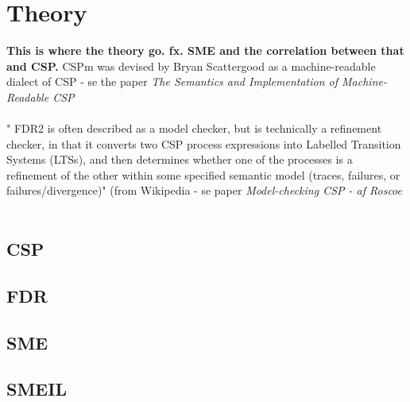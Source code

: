 \documentclass[a4paper]{report}
\begin{document}
\chapter{Theory}
\textbf{This is where the theory go. fx. SME and the correlation between that and CSP.}
CSPm was devised by Bryan Scattergood as a machine-readable dialect of CSP  - se the paper \textit{The Semantics and Implementation of Machine-Readable CSP}\\\\
" FDR2 is often described as a model checker, but is technically a refinement checker, in that it converts two CSP process expressions into Labelled Transition Systems (LTSs), and then determines whether one of the processes is a refinement of the other within some specified semantic model (traces, failures, or failures/divergence)" (from Wikipedia - se paper \textit{Model-checking CSP - af Roscoe} \\\\
\section{CSP}
\section{FDR}
\section{SME}
\section{SMEIL}
\end{document}
